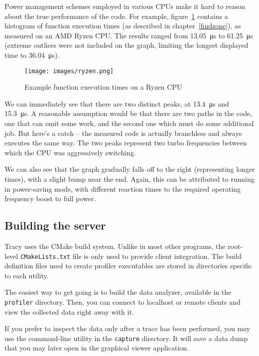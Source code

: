 \documentclass[hidelinks,titlepage,a4paper,twoside]{article}
\begin{document}
Power management schemes employed in various CPUs make it hard to reason about the true performance of the code. For example, figure~\ref{ryzenimage} contains a histogram of function execution times (as described in chapter~\ref{findzone}), as measured on an AMD Ryzen CPU. The results ranged from 13.05~\si{\micro\second} to 61.25~\si{\micro\second} (extreme outliers were not included on the graph, limiting the longest displayed time to 36.04~\si{\micro\second}).

\begin{figure}[h]
\centering
\texttt{[image: images/ryzen.png]}
\caption{Example function execution times on a Ryzen CPU}
\label{ryzenimage}
\end{figure}

We can immediately see that there are two distinct peaks, at 13.4~\si{\micro\second} and 15.3~\si{\micro\second}. A reasonable assumption would be that there are two paths in the code, one that can omit some work, and the second one which must do some additional job. But here's a catch -- the measured code is actually branchless and always executes the same way. The two peaks represent two turbo frequencies between which the CPU was aggressively switching.

We can also see that the graph gradually falls off to the right (representing longer times), with a slight bump near the end. Again, this can be attributed to running in power-saving mode, with different reaction times to the required operating frequency boost to full power.

\subsection{Building the server}
\label{buildingserver}

Tracy uses the CMake build system. Unlike in most other programs, the root-level \texttt{CMakeLists.txt} file is only used to provide client integration. The build definition files used to create profiler executables are stored in directories specific to each utility.

The easiest way to get going is to build the data analyzer, available in the \texttt{profiler} directory. Then, you can connect to localhost or remote clients and view the collected data right away with it.

If you prefer to inspect the data only after a trace has been performed, you may use the command-line utility in the \texttt{capture} directory. It will save a data dump that you may later open in the graphical viewer application.
\end{document}
